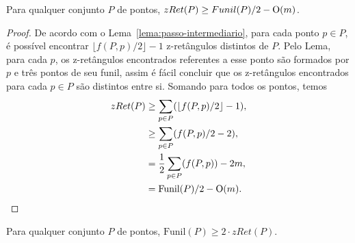 \begin{lemma} \label{lemma:zrets-funil}
    Para qualquer conjunto $P$ de pontos, $zRet(P) \geq Funil(P)/2 - \mathrm{O}(m)$.
\end{lemma}

\begin{proof}
    De acordo com o Lema~\ref{lema:passo-intermediario}, para cada ponto $p \in P$, é possível encontrar $\lfloor f(P,p)/2 \rfloor - 1$ z-retângulos distintos de $P$. Pelo Lema, para cada $p$, os z-retângulos encontrados referentes a esse ponto são formados por $p$ e três pontos de seu funil, assim é fácil concluir que os z-retângulos encontrados para cada $p \in P$ são distintos entre si. Somando para todos os pontos, temos
    \begin{align}
        zRet(P) &\geq \sum_{p \in P} (\lfloor f(P,p)/2 \rfloor - 1) , \notag \\
        &\geq \sum_{p \in P} (f(P,p)/2 - 2) , \notag \\
        &= \frac{1}{2} \sum_{p \in P} (f(P,p)) - 2m , \notag \\
        &= \text{Funil}(P)/2 - \mathrm{O}(m). \notag
    \end{align}
\end{proof}

\begin{lemma} \label{lemma:funil-zrets}
    Para qualquer conjunto $P$ de pontos, $\text{Funil}(P) \geq 2 \cdot zRet(P)$.
\end{lemma}

